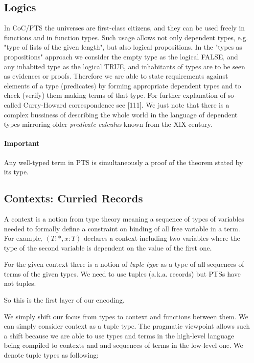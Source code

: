 \documentclass[11pt,oneside]{article}
\begin{document}
\subsection{Logics}
In CoC/PTS the universes are first-class citizens,
and they can be used freely in functions and in function types.
Such usage allows not only dependent types, e.g. "type of lists of the
given length", but also logical propositions.
In the "types as propositions" approach we consider the empty type
as the logical FALSE, and any inhabited type as the logical TRUE,
and inhabitants of types are to be seen as evidences or proofs.
Therefore we are able to state requirements against elements of a type
(predicates) by forming appropriate dependent types
and to check (verify) them making terms of that type.
For further explanation of so-called Curry-Howard correspondence
see [111].
We just note that there is a complex bussiness of
describing the whole world in the language of dependent types
mirroring older {\em predicate calculus} known from the XIX century.

\paragraph{Important}
Any well-typed term in PTS is simultaneously a proof of the theorem stated by its type.

\subsection{Contexts: Curried Records}

A context is a notion from type theory meaning a sequence of types of variables
needed to formally define a constraint on binding of all free variable in a term.
For example, $( T : *, x : T )$ declares a context including two variables where
the type of the second variable is dependent on the value of the first one.

For the given context there is a notion of {\em tuple type}
as a type of all sequences of terms of the given types.
We need to use tuples (a.k.a. records) but PTSs have not tuples.

So this is the first layer of our encoding.

We simply shift our focus from types to context and functions between them.
We can simply consider context as a tuple type.
The pragmatic viewpoint allows such a shift because we are able to use
types and terms in the high-level language being compiled to contexts and and sequences of terms in the low-level one.
We denote tuple types as following:
\end{document}
